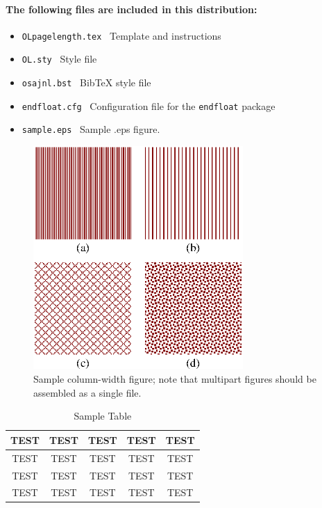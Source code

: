 \documentclass[10pt,letterpaper,twocolumn]{article} %
\begin{document}
\paragraph{The following files are included in this distribution:}
\begin{itemize}\itemsep-2pt
\item\texttt{OLpagelength.tex} \ Template and instructions 
\item\texttt{OL.sty} \ Style file 
\item\texttt{osajnl.bst} \ BibTeX style file
\item\texttt{endfloat.cfg} \ Configuration file for the \texttt{endfloat} package
\item\texttt{sample.eps} \ Sample .eps figure.
\end{itemize}

\bigskip

\begin{figure}[htb]
\centerline{\includegraphics[width=8cm]{sample.eps}}
\caption{Sample column-width figure; note that multipart figures should be assembled as a single file.}
\end{figure}


\begin{table}
  \centering
  \caption{Sample Table}\begin{tabular}{ccccc} \\ \hline
    TEST & TEST & TEST & TEST & TEST \\ \hline
    TEST & TEST & TEST & TEST & TEST \\
    TEST & TEST & TEST & TEST & TEST \\
    TEST & TEST & TEST & TEST & TEST \\ \hline
  \end{tabular}
\end{table}
\end{document}
